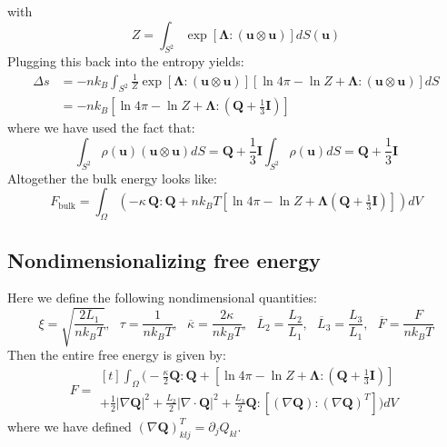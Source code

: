 \documentclass[reqno]{article}
\newcommand{\Q}{\mathbf{Q}}
\newcommand{\bLambda}{\boldsymbol{\Lambda}}
\begin{document}
with
\begin{equation}
    Z
    =
    \int_{S^2} \exp \left[ \bLambda : \left( \mathbf u \otimes \mathbf u \right) \right] dS( \mathbf u )
\end{equation}
Plugging this back into the entropy yields:
\begin{equation}
    \begin{split}
    \Delta s
    &=
    -n k_B \int_{S^2}
        \frac{1}{Z} \exp \left[ \bLambda : \left( \mathbf u \otimes \mathbf u \right) \right]
        \left[
            \ln 4 \pi
            - \ln Z
            + \bLambda : \left( \mathbf u \otimes \mathbf u \right)
        \right]
    dS \\
    &=
    -n k_B \left[
        \ln 4 \pi - \ln Z
        + \bLambda : \left(\Q + \tfrac13 \mathbf I \right)
    \right]
    \end{split}
\end{equation}
where we have used the fact that:
\begin{equation}
    \int_{S^2} \rho(\mathbf u) \left( \mathbf u \otimes \mathbf u \right) dS
    =
    \Q + \frac13 \mathbf I \int_{S^2} \rho(\mathbf u ) dS
    =
    \Q + \frac13 \mathbf I
\end{equation}
Altogether the bulk energy looks like:
\begin{equation}
    F_\text{bulk}
    =
    \int_\Omega
    \left(
        -\kappa \, \Q : \Q
        + n k_B T \left[ \ln 4 \pi - \ln Z + \bLambda \left( \Q + \tfrac13 \mathbf I \right) \right]
    \right) dV
\end{equation}

\subsection{Nondimensionalizing free energy}

Here we define the following nondimensional quantities:
\begin{equation} \label{eq:nondimensional-quantities}
    \xi = \sqrt{\frac{2L_1}{n k_B T}}, \:\:\:
    \tau = \frac{1}{n k_B T}, \:\:\:
    \overline{\kappa} = \frac{2 \kappa}{n k_B T}, \:\:\:
    \overline{L}_2 = \frac{L_2}{L_1}, \:\:\:
    \overline{L}_3 = \frac{L_3}{L_1}, \:\:\:
    \overline{F} = \frac{F}{n k_B T}
\end{equation}
Then the entire free energy is given by:
\begin{equation}
    F
    =
    \begin{multlined}[t]
    \int_\Omega 
    \biggl(
        -\frac{\kappa}{2} \Q : \Q
        + \left[ \ln 4 \pi - \ln Z + \bLambda : \left(\Q + \tfrac13 \mathbf I \right) \right] \\
        + \frac12 \left| \nabla \Q \right|^2 
        + \frac{L_2}{2} \left| \nabla \cdot \Q \right|^2
        + \frac{L_3}{2} \Q : \left[ \left( \nabla \Q \right) : \left( \nabla \Q \right)^T \right]
    \biggr) dV
    \end{multlined}
\end{equation}
where we have defined $\left( \nabla \Q \right)^T_{klj} = \partial_j Q_{kl}$.
\end{document}
